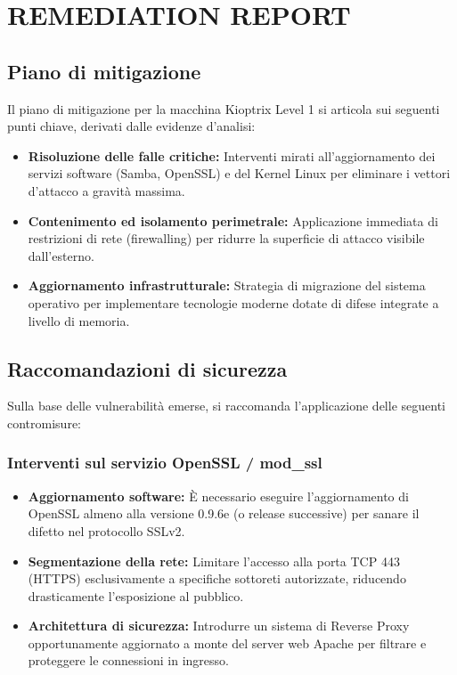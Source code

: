 \documentclass[12pt, a4paper]{article}
\begin{document}
	\newpage
	\section{REMEDIATION REPORT}

	\subsection{Piano di mitigazione}
	Il piano di mitigazione per la macchina Kioptrix Level 1 si articola sui seguenti punti chiave, derivati dalle evidenze d'analisi:

	\begin{itemize}
		\item \textbf{Risoluzione delle falle critiche:} Interventi mirati all'aggiornamento dei servizi software (Samba, OpenSSL) e del Kernel Linux per eliminare i vettori d'attacco a gravità massima.
		\item \textbf{Contenimento ed isolamento perimetrale:} Applicazione immediata di restrizioni di rete (firewalling) per ridurre la superficie di attacco visibile dall'esterno.
		\item \textbf{Aggiornamento infrastrutturale:} Strategia di migrazione del sistema operativo per implementare tecnologie moderne dotate di difese integrate a livello di memoria.
	\end{itemize}

	\vspace{0.5cm}
	\subsection{Raccomandazioni di sicurezza}
	Sulla base delle vulnerabilità emerse, si raccomanda l'applicazione delle seguenti contromisure:

	\subsubsection*{\textbf{Interventi sul servizio OpenSSL / mod\_ssl}}
	\begin{itemize}
		\item \textbf{Aggiornamento software:} È necessario eseguire l'aggiornamento di OpenSSL almeno alla versione 0.9.6e (o release successive) per sanare il difetto nel protocollo SSLv2.
		\item \textbf{Segmentazione della rete:} Limitare l'accesso alla porta TCP 443 (HTTPS) esclusivamente a specifiche sottoreti autorizzate, riducendo drasticamente l'esposizione al pubblico.
		\item \textbf{Architettura di sicurezza:} Introdurre un sistema di Reverse Proxy opportunamente aggiornato a monte del server web Apache per filtrare e proteggere le connessioni in ingresso.
	\end{itemize}
\end{document}
